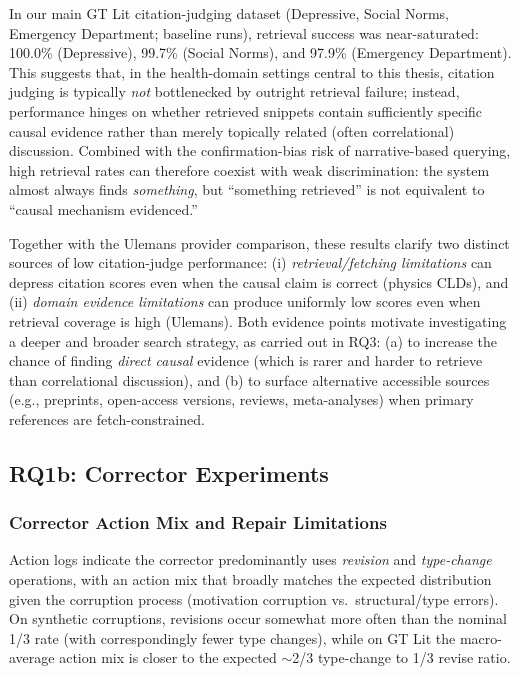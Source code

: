 In our main GT Lit citation-judging dataset (Depressive, Social Norms, Emergency Department; baseline runs), retrieval success was near-saturated: 100.0\% (Depressive), 99.7\% (Social Norms), and 97.9\% (Emergency Department). This suggests that, in the health-domain settings central to this thesis, citation judging is typically \textit{not} bottlenecked by outright retrieval failure; instead, performance hinges on whether retrieved snippets contain sufficiently specific causal evidence rather than merely topically related (often correlational) discussion. Combined with the confirmation-bias risk of narrative-based querying, high retrieval rates can therefore coexist with weak discrimination: the system almost always finds \textit{something}, but ``something retrieved'' is not equivalent to ``causal mechanism evidenced.''

Together with the Ulemans provider comparison, these results clarify two distinct sources of low citation-judge performance: (i) \textit{retrieval/fetching limitations} can depress citation scores even when the causal claim is correct (physics CLDs), and (ii) \textit{domain evidence limitations} can produce uniformly low scores even when retrieval coverage is high (Ulemans). Both evidence points motivate investigating a deeper and broader search strategy, as carried out in RQ3: (a) to increase the chance of finding \textit{direct causal} evidence (which is rarer and harder to retrieve than correlational discussion), and (b) to surface alternative accessible sources (e.g., preprints, open-access versions, reviews, meta-analyses) when primary references are fetch-constrained.

\subsection{RQ1b: Corrector Experiments}
\label{sec:discussion_rq1b}

\subsubsection{Corrector Action Mix and Repair Limitations}

Action logs indicate the corrector predominantly uses \textit{revision} and \textit{type-change} operations, with an action mix that broadly matches the expected distribution given the corruption process (motivation corruption vs.\ structural/type errors). On synthetic corruptions, revisions occur somewhat more often than the nominal 1/3 rate (with correspondingly fewer type changes), while on GT Lit the macro-average action mix is closer to the expected $\sim$2/3 type-change to 1/3 revise ratio.

